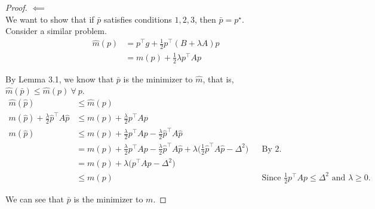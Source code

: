 \documentclass[a4paper]{article}
\begin{document}
\begin{proof} $\impliedby$ \\

We want to show that if $\bar p$ satisfies conditions $1, 2, 3$, then $\bar p = p^\star$. \\

Consider a similar problem.
\begin{align*}
\hat m(p) &= p^\intercal g + \frac{1}{2} p^\intercal (B + \lambda A) p \\
&= m(p) + \frac{1}{2} \lambda p^\intercal A p
\end{align*}

By Lemma 3.1, we know that $\bar p$ is the minimizer to $\hat m$, that is, $\hat m(\bar p) \leq \hat m(p)\ \forall\ p$. 
\begin{align*}
\hat m(\hat p) &\leq \hat m(p) \\
m(\hat p) + \frac{\lambda}{2} \hat p^\intercal A \hat p &\leq m(p) + \frac{\lambda}{2} p^\intercal A p \\
m(\hat p) &\leq m(p) + \frac{\lambda}{2} p^\intercal A p - \frac{\lambda}{2} \hat p^\intercal A \hat p  \\
&= m(p) + \frac{\lambda}{2} p^\intercal A p - \frac{\lambda}{2} \hat p^\intercal A \hat p  + \lambda \Big(\frac{1}{2} \hat p^\intercal A \hat p - \Delta^2 \Big) && \text{By 2.} \\
&= m(p) + \lambda \Big( p^\intercal A p - \Delta^2 \Big) \\
&\leq m(p) && \text{Since $\frac{1}{2} p^\intercal A p \leq \Delta^2$ and $\lambda \geq 0$.}
\end{align*}

We can see that $\bar p$ is the minimizer to $m$.

\end{proof}
\end{document}
